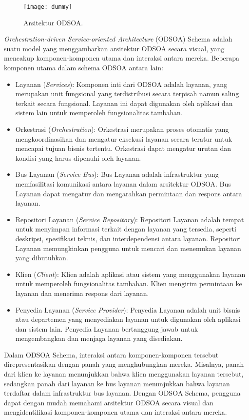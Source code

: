 \begin{figure}[h]
	\centering
\texttt{[image: dummy]}
	\caption {Arsitektur ODSOA.}
	\label{fig:Arsitektur ODSOA} 
\end{figure}

\textit{Orchestration-driven Service-oriented Architecture} (ODSOA) Schema adalah suatu model yang menggambarkan arsitektur ODSOA secara visual, yang mencakup komponen-komponen utama dan interaksi antara mereka. Beberapa komponen utama dalam schema ODSOA antara lain:
	\begin{itemize}
	\item Layanan (\textit{Services}): Komponen inti dari ODSOA adalah layanan, yang merupakan unit fungsional yang terdistribusi secara terpisah namun saling terkait secara fungsional. Layanan ini dapat digunakan oleh aplikasi dan sistem lain untuk memperoleh fungsionalitas tambahan.
	\item Orkestrasi (\textit{Orchestration}): Orkestrasi merupakan proses otomatis yang mengkoordinasikan dan mengatur eksekusi layanan secara teratur untuk mencapai tujuan bisnis tertentu. Orkestrasi dapat mengatur urutan dan kondisi yang harus dipenuhi oleh layanan.
	\item Bus Layanan (\textit{Service Bus}): Bus Layanan adalah infrastruktur yang memfasilitasi komunikasi antara layanan dalam arsitektur ODSOA. Bus Layanan dapat mengatur dan mengarahkan permintaan dan respons antara layanan.
	\item Repositori Layanan (\textit{Service Repository}): Repositori Layanan adalah tempat untuk menyimpan informasi terkait dengan layanan yang tersedia, seperti deskripsi, spesifikasi teknis, dan interdependensi antara layanan. Repositori Layanan memungkinkan pengguna untuk mencari dan menemukan layanan yang dibutuhkan.
	\item Klien (\textit{Client}): Klien adalah aplikasi atau sistem yang menggunakan layanan untuk memperoleh fungsionalitas tambahan. Klien mengirim permintaan ke layanan dan menerima respons dari layanan.
	\item Penyedia Layanan (\textit{Service Provider}): Penyedia Layanan adalah unit bisnis atau departemen yang menyediakan layanan untuk digunakan oleh aplikasi dan sistem lain. Penyedia Layanan bertanggung jawab untuk mengembangkan dan menjaga layanan yang disediakan.
	\end{itemize}
Dalam ODSOA Schema, interaksi antara komponen-komponen tersebut direpresentasikan dengan panah yang menghubungkan mereka. Misalnya, panah dari klien ke layanan menunjukkan bahwa klien menggunakan layanan tersebut, sedangkan panah dari layanan ke bus layanan menunjukkan bahwa layanan terdaftar dalam infrastruktur bus layanan. Dengan ODSOA Schema, pengguna dapat dengan mudah memahami arsitektur ODSOA secara visual dan mengidentifikasi komponen-komponen utama dan interaksi antara mereka.

